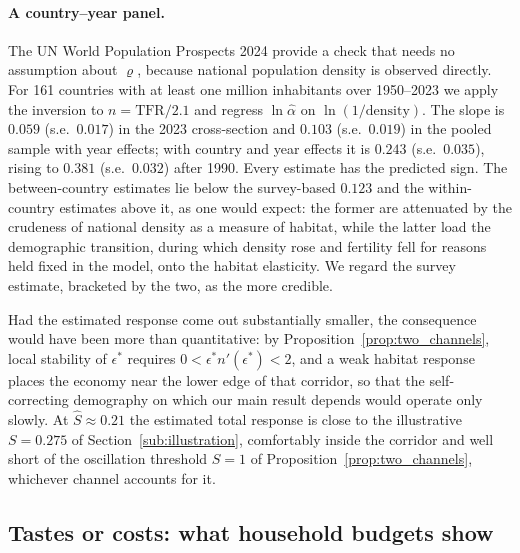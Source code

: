 \documentclass[11pt]{article}
\begin{document}
\paragraph{A country--year panel.}
The UN World Population Prospects 2024 provide a check that needs no assumption about $\varrho$,
because national population density is observed directly. For 161 countries with at least one
million inhabitants over 1950--2023 we apply the inversion to $n=\text{TFR}/2.1$ and regress
$\ln\hat\alpha$ on $\ln(1/\text{density})$. The slope is $0.059$ (s.e.\ $0.017$) in the 2023
cross-section and $0.103$ (s.e.\ $0.019$) in the pooled sample with year effects; with country and
year effects it is $0.243$ (s.e.\ $0.035$), rising to $0.381$ (s.e.\ $0.032$) after 1990. Every
estimate has the predicted sign. The between-country estimates lie below the survey-based
$0.123$ and the within-country estimates above it, as one would expect: the former are attenuated
by the crudeness of national density as a measure of habitat, while the latter load the
demographic transition, during which density rose and fertility fell for reasons held fixed in the
model, onto the habitat elasticity. We regard the survey estimate, bracketed by the two, as the
more credible.

Had the estimated response come out substantially smaller, the consequence would have been more than
quantitative: by Proposition~\ref{prop:two_channels}, local stability of $\epsilon^{\ast}$ requires
$0<\epsilon^{\ast}n'(\epsilon^{\ast})<2$, and a weak habitat response places the economy near the
lower edge of that corridor, so that the self-correcting demography on which our main result depends
would operate only slowly. At $\hat S\approx0.21$ the estimated total response is close to the
illustrative $S=0.275$ of Section~\ref{sub:illustration}, comfortably inside the corridor and well short of the oscillation threshold $S=1$ of
Proposition~\ref{prop:two_channels}, whichever channel accounts for it.

\subsection{Tastes or costs: what household budgets show}
\label{sub:budget}
\end{document}
